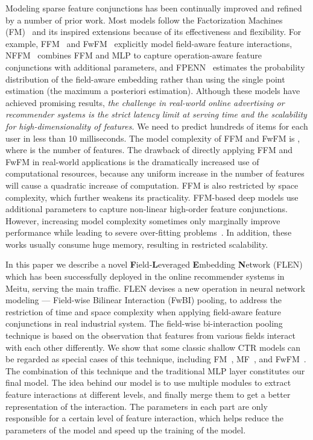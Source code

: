 \documentclass[sigconf]{acmart}
\begin{document}
Modeling sparse feature conjunctions has been continually improved and refined by a number of prior work. 
Most models follow the Factorization Machines (FM)~\citep{rendle2010factorization} and its inspired extensions because of its effectiveness and flexibility. 
For example, FFM~\citep{juan2017field} and FwFM~\citep{pan2018field,deng2020sparse} explicitly model field-aware feature interactions, NFFM~\citep{Yang2019Operation} combines FFM and MLP to capture operation-aware feature conjunctions with additional parameters, and FPENN~\citep{Liu2018Field} estimates the probability distribution of the field-aware embedding rather than using the single point estimation (the maximum a posteriori estimation).
Although these models have achieved promising results, \textit{the challenge in real-world online advertising or recommender systems is the strict latency limit at serving time and the scalability for high-dimensionality of features.} We need to predict hundreds of items for each user in less than 10 milliseconds.
The model complexity of FFM and FwFM is , where  is the number of features. The drawback of directly applying FFM and FwFM in real-world applications is the dramatically increased use of computational resources, because any uniform increase in the number of features will cause a quadratic increase of computation.  
FFM is also restricted by space complexity, which further weakens its practicality. 
FFM-based deep models use additional parameters to capture non-linear high-order
feature conjunctions. However, increasing model complexity sometimes only marginally improve performance while leading to severe over-fitting problems~\citep{he2017neural}. In addition, these works usually consume huge memory, resulting in restricted scalability.

In this paper we describe a novel \textbf{F}ield-\textbf{L}everaged \textbf{E}mbedding \textbf{N}etwork (FLEN) which has been successfully deployed in the online recommender systems in Meitu, serving the main traffic. FLEN devises a new operation in neural network modeling — Field-wise Bilinear Interaction (FwBI) pooling, to address the restriction of time and space complexity when applying field-aware feature conjunctions in real industrial system.
The field-wise bi-interaction pooling technique is based on the observation that features from various fields interact with each other differently.
We show that some classic shallow CTR models can be regarded as special cases of this technique, including FM~\citep{rendle2010factorization}, MF~\citep{Koren2009Matrix},  and FwFM~\citep{pan2018field}.
The combination of this technique and the traditional MLP layer constitutes our final model. The idea behind our model is to use multiple modules to extract feature interactions at different levels, and finally merge them to get a better representation of the interaction. 
The parameters in each part are only responsible for a certain level of feature interaction, which helps reduce the parameters of the model and speed up the training of the model.
\end{document}
